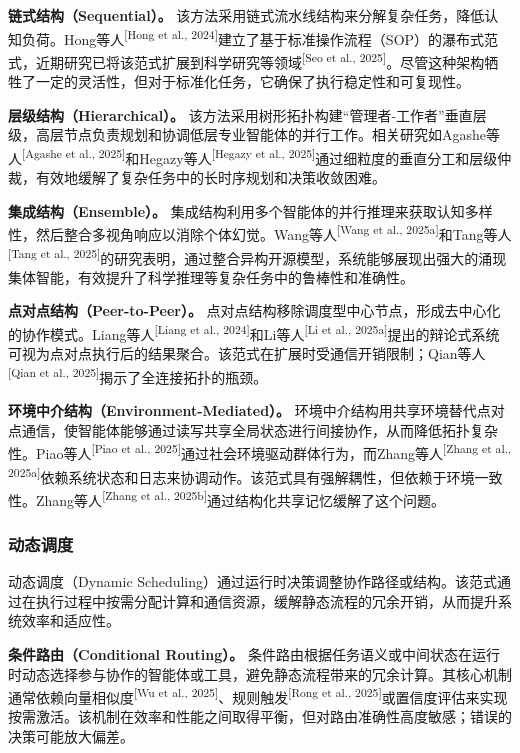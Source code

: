 \documentclass[UTF8,a4paper,12pt]{article}
\begin{document}
\textbf{链式结构（Sequential）。} 该方法采用链式流水线结构来分解复杂任务，降低认知负荷。Hong等人\textsuperscript{[Hong et al., 2024]}建立了基于标准操作流程（SOP）的瀑布式范式，近期研究已将该范式扩展到科学研究等领域\textsuperscript{[Seo et al., 2025]}。尽管这种架构牺牲了一定的灵活性，但对于标准化任务，它确保了执行稳定性和可复现性。

\textbf{层级结构（Hierarchical）。} 该方法采用树形拓扑构建``管理者-工作者''垂直层级，高层节点负责规划和协调低层专业智能体的并行工作。相关研究如Agashe等人\textsuperscript{[Agashe et al., 2025]}和Hegazy等人\textsuperscript{[Hegazy et al., 2025]}通过细粒度的垂直分工和层级仲裁，有效地缓解了复杂任务中的长时序规划和决策收敛困难。

\textbf{集成结构（Ensemble）。} 集成结构利用多个智能体的并行推理来获取认知多样性，然后整合多视角响应以消除个体幻觉。Wang等人\textsuperscript{[Wang et al., 2025a]}和Tang等人\textsuperscript{[Tang et al., 2025]}的研究表明，通过整合异构开源模型，系统能够展现出强大的涌现集体智能，有效提升了科学推理等复杂任务中的鲁棒性和准确性。

\textbf{点对点结构（Peer-to-Peer）。} 点对点结构移除调度型中心节点，形成去中心化的协作模式。Liang等人\textsuperscript{[Liang et al., 2024]}和Li等人\textsuperscript{[Li et al., 2025a]}提出的辩论式系统可视为点对点执行后的结果聚合。该范式在扩展时受通信开销限制；Qian等人\textsuperscript{[Qian et al., 2025]}揭示了全连接拓扑的瓶颈。

\textbf{环境中介结构（Environment-Mediated）。} 环境中介结构用共享环境替代点对点通信，使智能体能够通过读写共享全局状态进行间接协作，从而降低拓扑复杂性。Piao等人\textsuperscript{[Piao et al., 2025]}通过社会环境驱动群体行为，而Zhang等人\textsuperscript{[Zhang et al., 2025a]}依赖系统状态和日志来协调动作。该范式具有强解耦性，但依赖于环境一致性。Zhang等人\textsuperscript{[Zhang et al., 2025b]}通过结构化共享记忆缓解了这个问题。

\subsubsection{动态调度}

动态调度（Dynamic Scheduling）通过运行时决策调整协作路径或结构。该范式通过在执行过程中按需分配计算和通信资源，缓解静态流程的冗余开销，从而提升系统效率和适应性。

\textbf{条件路由（Conditional Routing）。} 条件路由根据任务语义或中间状态在运行时动态选择参与协作的智能体或工具，避免静态流程带来的冗余计算。其核心机制通常依赖向量相似度\textsuperscript{[Wu et al., 2025]}、规则触发\textsuperscript{[Rong et al., 2025]}或置信度评估来实现按需激活。该机制在效率和性能之间取得平衡，但对路由准确性高度敏感；错误的决策可能放大偏差。
\end{document}
